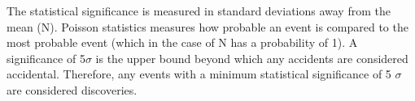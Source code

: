 \documentclass[runningheads,a4paper]{llncs}
\begin{document}
The statistical significance is measured in standard deviations away from the mean (N). Poisson statistics measures how probable an event is compared to the most probable event (which in the case of N has a probability of 1). A significance of 5$\sigma$ is the upper bound beyond which any accidents are considered accidental. Therefore, any events with a minimum statistical significance of 5 $\sigma$  are considered discoveries.\\


 

\end{document}
